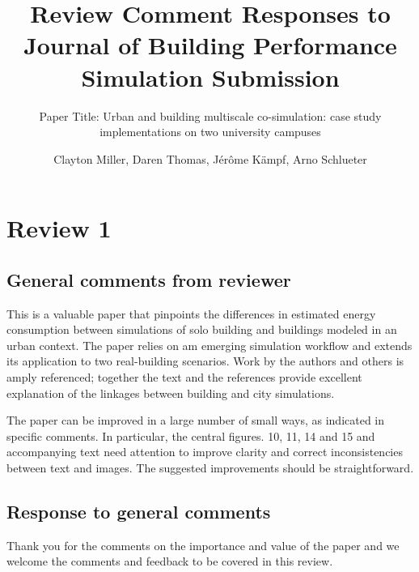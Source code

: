 \documentclass[answers,12pt]{exam}
\title{Review Comment Responses to Journal of Building Performance Simulation Submission}
\subtitle{Paper Title: Urban and building multiscale co-simulation: case study implementations on two university campuses 
}
\author{Clayton Miller, Daren Thomas, J\'er\^ome K\"ampf, Arno Schlueter}
\begin{document}
\maketitle




\section{Review 1}

\subsection{General comments from reviewer}
This is a valuable paper that pinpoints the differences in estimated energy consumption between simulations of solo building and buildings modeled in an urban context.  The paper relies on am emerging simulation workflow and extends its application to two real-building scenarios.  Work by the authors and others is amply referenced; together the text and the references provide excellent explanation of the linkages between building and city simulations. 

The paper can be improved in a large number of small ways, as indicated in specific comments.  In particular, the central figures. 10, 11, 14 and 15 and accompanying text need attention to improve clarity and correct inconsistencies between text and images.  The suggested improvements should be straightforward. 

\subsection{Response to general comments}
\begin{solution}
Thank you for the comments on the importance and value of the paper and we welcome the comments and feedback to be covered in this review.
\end{solution}
\end{document}
